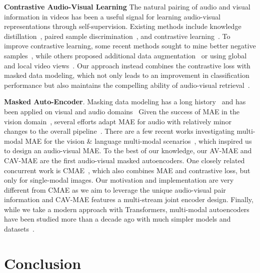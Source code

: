 \documentclass{article} \usepackage{iclr2023_conference,times}
\begin{document}
\noindent \textbf{Contrastive Audio-Visual Learning}
The natural pairing of audio and visual information in videos has been a useful signal for learning audio-visual representations through self-supervision. Existing methods include knowledge distillation~\citep{aytar2016soundnet,owens2016ambient}, paired sample discrimination~\citep{arandjelovic2017look,korbar2018cooperative,owens2018audio}, and contrastive learning~\citep{morgado2021audio}. To improve contrastive learning, some recent methods sought to mine better negative samples~\citep{ma2020active,morgado2021robust}, while others proposed additional data augmentation~\citep{patrick2021compositions,wang2021multimodal} or using global and local video views~\citep{zeng2021contrastive,recasens2021broaden}. Our approach instead combines the contrastive loss with masked data modeling, which not only leads to an improvement in classification performance but also maintains the compelling ability of audio-visual retrieval~\citep{arandjelovic2018objects,rouditchenko2021avlnet}. 

\noindent \textbf{Masked Auto-Encoder}. Masking data modeling has a long history~\citep{vincent2008extracting} and has been applied on visual and audio domains~\citep{baevski2020wav2vec,hsu2021hubert,srivastava2022conformer} Given the success of MAE in the vision domain~\citep{he2022masked,bachmann2022multimae,girdhar2022omnimae,videomae,feichtenhofer2022masked}, several efforts adapt MAE for audio with relatively minor changes to the overall pipeline~\citep{baade2022mae,niizumi2022masked,chong2022masked,xu2022masked}. There are a few recent works investigating multi-modal MAE for the vision \& language multi-modal scenarios~\citep{geng2022multimodal,kwon2022masked}, which inspired us to design an audio-visual MAE. To the best of our knowledge, our AV-MAE and CAV-MAE are the first audio-visual masked autoencoders. One closely related concurrent work is CMAE~\citep{huang2022contrastive}, which also combines MAE and contrastive loss, but only for single-modal images. Our motivation and implementation are very different from CMAE as we aim to leverage the unique audio-visual pair information and CAV-MAE features a multi-stream joint encoder design. Finally, while we take a modern approach with Transformers, multi-modal autoencoders have been studied more than a decade ago with much simpler models and datasets~\citep{ngiam2011multimodal}.

\vspace{-2mm}
\section{Conclusion}
\end{document}
